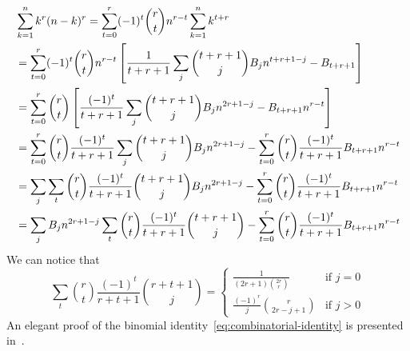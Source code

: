 \begin{equation*}
    \begin{split}
        &\sum_{k=1}^{n} k^{r} (n-k)^{r}
        = \sum_{t=0}^{r} (-1)^t \binom{r}{t} n^{r-t} \sum_{k=1}^{n} k^{t+r} \\
        &= \sum_{t=0}^{r} (-1)^t \binom{r}{t} n^{r-t} \left[ \frac{1}{t+r+1} \sum_{j} \binom{t+r+1}{j} {B}\sb{j} n^{t+r+1-j} - {B}\sb{t+r+1} \right] \\
        &= \sum_{t=0}^{r} \binom{r}{t} \left[ \frac{(-1)^t}{t+r+1} \sum_{j} \binom{t+r+1}{j} {B}\sb{j} n^{2r+1-j} - {B}\sb{t+r+1} n^{r-t} \right] \\
        &= \sum_{t=0}^{r} \binom{r}{t} \frac{(-1)^t}{t+r+1} \sum_{j} \binom{t+r+1}{j} {B}\sb{j} n^{2r+1-j} - \sum_{t=0}^{r} \binom{r}{t} \frac{(-1)^t}{t+r+1} {B}\sb{t+r+1} n^{r-t} \\
        &= \sum_{j} \sum_{t} \binom{r}{t} \frac{(-1)^t}{t+r+1} \binom{t+r+1}{j} {B}\sb{j} n^{2r+1-j} - \sum_{t=0}^{r} \binom{r}{t} \frac{(-1)^t}{t+r+1} {B}\sb{t+r+1} n^{r-t} \\
        &= \sum_{j} {B}\sb{j} n^{2r+1-j} \sum_{t} \binom{r}{t} \frac{(-1)^t}{t+r+1} \binom{t+r+1}{j} - \sum_{t=0}^{r} \binom{r}{t} \frac{(-1)^t}{t+r+1} {B}\sb{t+r+1} n^{r-t}
    \end{split}
\end{equation*}
We can notice that
\begin{equation}
    \sum_{t} \binom{r}{t} \frac{(-1)^t}{r+t+1} \binom{r+t+1}{j}
    =\begin{cases}
         \frac{1}{(2r+1) \binom{2r}r} & \text{if } j=0\\
         \frac{(-1)^r}{j} \binom{r}{2r-j+1} & \text{if } j>0
    \end{cases}\label{eq:combinatorial-identity}
\end{equation}
An elegant proof of the binomial identity~\eqref{eq:combinatorial-identity} is presented in~\cite{scheuer2023mathstackexchange}.

